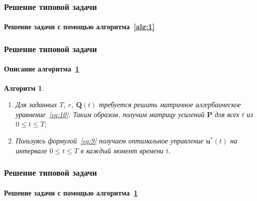 \documentclass[ignorenonframetext,hyperref={pdftex,unicode},compress]{beamer}
\newtheorem{alg}{Алгоритм}
\begin{document}
\begin{frame}
	\frametitle{Решение типовой задачи}
	\framesubtitle{Решение задачи с помощью алгоритма~\ref{alg:1}}
    
    \begin{figure}\center
        
        \label{fig:alg1}
    \end{figure}
\end{frame}



\begin{frame}
	\frametitle{Решение типовой задачи}
	\framesubtitle{Описание алгоритма~\ref{alg:2}}
    
    \begin{alg}\label{alg:2}~
        \begin{enumerate}
            \item
                Для заданных $T$, $r$, $\mathbf{Q}(t)$ требуется решить матричное алгербаическое уравнение~\ref{eq:10}. Таким образом, получим матрицу усилений $\mathbf{P}$ для всех $t$ из $0 \leqslant t \leqslant T$;

            \item
                Пользуясь формулой~\ref{eq:9} получаем оптимальное управление $\mathbf{u}^*(t)$ на интервале $0 \leqslant t \leqslant T$ в каждый момент времени $t$.
        \end{enumerate}
    \end{alg}
\end{frame}



\begin{frame}
	\frametitle{Решение типовой задачи}
	\framesubtitle{Решение задачи с помощью алгоритма~\ref{alg:2}}
    
    \begin{figure}\center
        
        \label{fig:alg2}
    \end{figure}
\end{frame}
\end{document}
